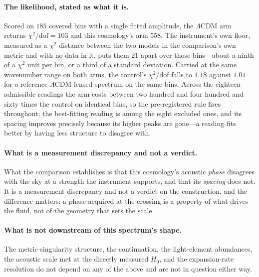 \paragraph{The likelihood, stated as what it is.} Scored on $185$ covered bins with a single
fitted amplitude, the $\Lambda$CDM arm returns $\chi^{2}/\mathrm{dof}=103$ and this cosmology's
arm $558$. The instrument's own floor, measured as a $\chi^{2}$ distance between the two models in
the comparison's own metric and with no data in it, puts them $21$ apart over those bins---about a
ninth of a $\chi^{2}$ unit per bin, or a third of a standard
deviation. Carried at
the same wavenumber range on both arms, the control's $\chi^{2}/\mathrm{dof}$ falls to $1.18$
against $1.01$ for a reference $\Lambda$CDM lensed spectrum on the same
bins. Across the eighteen admissible readings the arm costs
between two hundred and four hundred and sixty times the control on identical bins, so the
pre-registered rule fires throughout; the best-fitting reading is among the eight excluded ones,
and its spacing improves precisely because its higher peaks are gone---a reading fits better by
having less structure to disagree with.

\paragraph{What is a measurement discrepancy and not a verdict.} What the comparison establishes
is that this cosmology's acoustic \emph{phase} disagrees with the sky at a strength the instrument
supports, and that its \emph{spacing} does not. It is a measurement discrepancy and not a verdict
on the construction, and the difference matters: a phase acquired at the crossing is a property of
what drives the fluid, not of the geometry that sets the scale.

\paragraph{What is not downstream of this spectrum's shape.} The metric-singularity structure, the
continuation, the light-element abundances, the acoustic scale met at the directly measured
$H_{0}$, and the expansion-rate resolution do not depend on any of the above and are not in
question either way.

